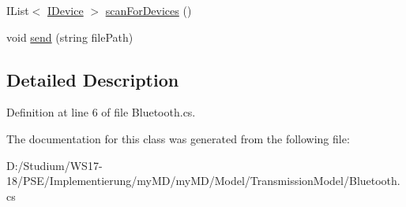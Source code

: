 \begin{CompactItemize}
\item 
\hypertarget{classmy_m_d_1_1_model_1_1_transmission_model_1_1_bluetooth_d4a4716dff7f620af2484491e860e8c2}{
IList$<$ \hyperlink{interfacemy_m_d_1_1_model_interface_1_1_transmission_model_interface_1_1_i_device}{IDevice} $>$ \hyperlink{classmy_m_d_1_1_model_1_1_transmission_model_1_1_bluetooth_d4a4716dff7f620af2484491e860e8c2}{scan\-For\-Devices} ()}
\label{da/d81/classmy_m_d_1_1_model_1_1_transmission_model_1_1_bluetooth_d4a4716dff7f620af2484491e860e8c2}

\item 
\hypertarget{classmy_m_d_1_1_model_1_1_transmission_model_1_1_bluetooth_c93138213657ab3cf818aed9dd56e567}{
void \hyperlink{classmy_m_d_1_1_model_1_1_transmission_model_1_1_bluetooth_c93138213657ab3cf818aed9dd56e567}{send} (string file\-Path)}
\label{da/d81/classmy_m_d_1_1_model_1_1_transmission_model_1_1_bluetooth_c93138213657ab3cf818aed9dd56e567}

\end{CompactItemize}


\subsection{Detailed Description}




Definition at line 6 of file Bluetooth.cs.

The documentation for this class was generated from the following file:\begin{CompactItemize}
\item 
D:/Studium/WS17-18/PSE/Implementierung/my\-MD/my\-MD/Model/Transmission\-Model/Bluetooth.cs\end{CompactItemize}
